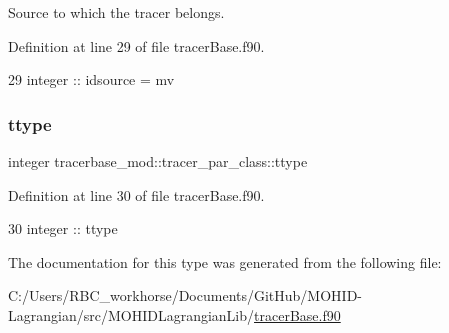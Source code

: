 Source to which the tracer belongs. 



Definition at line 29 of file tracer\+Base.\+f90.


\begin{DoxyCode}
29         \textcolor{keywordtype}{integer} :: idsource = mv                 
\end{DoxyCode}
\mbox{\label{structtracerbase__mod_1_1tracer__par__class_a4a5c162c0630aeda90c18e0641894dcc}} 
\subsubsection{\texorpdfstring{ttype}{ttype}}
{\footnotesize\ttfamily integer tracerbase\+\_\+mod\+::tracer\+\_\+par\+\_\+class\+::ttype\hspace{0.3cm}{\ttfamily [private]}}



Definition at line 30 of file tracer\+Base.\+f90.


\begin{DoxyCode}
30         \textcolor{keywordtype}{integer} :: ttype
\end{DoxyCode}


The documentation for this type was generated from the following file\+:\begin{DoxyCompactItemize}
\item 
C\+:/\+Users/\+R\+B\+C\+\_\+workhorse/\+Documents/\+Git\+Hub/\+M\+O\+H\+I\+D-\/\+Lagrangian/src/\+M\+O\+H\+I\+D\+Lagrangian\+Lib/\mbox{\hyperlink{tracer_base_8f90}{tracer\+Base.\+f90}}\end{DoxyCompactItemize}
